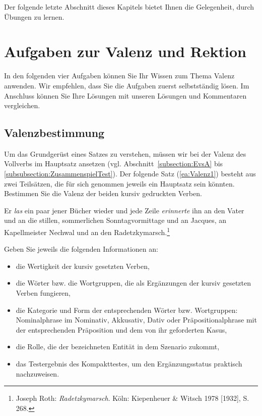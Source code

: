 Der folgende letzte Abschnitt dieses Kapitels bietet Ihnen die Gelegenheit, durch Übungen zu lernen.


\section{Aufgaben zur Valenz und Rektion}\label{section:Aufgaben_Valenz_Rektion}

In den folgenden vier Aufgaben können Sie Ihr Wissen zum Thema Valenz anwenden. Wir empfehlen, dass Sie die Aufgaben zuerst selbstständig lösen. Im Anschluss können Sie Ihre Lösungen mit unseren Lösungen und Kommentaren vergleichen.


\subsection{Valenzbestimmung}\label{subsection:Valenz1}

Um das Grundgerüst eines Satzes zu verstehen, müssen wir bei der Valenz des Vollverbs im Hauptsatz ansetzen (vgl. Abschnitt~\ref{subsection:EvsA} bis \ref{subsubsection:ZusammenspielTest}). Der folgende Satz (\ref{ea:Valenz1}) besteht aus zwei Teilsätzen, die für sich genommen jeweils ein Hauptsatz sein könnten. Bestimmen Sie die Valenz der beiden kursiv gedruckten Verben.

\ea \label{ea:Valenz1} Er \textit{las} ein paar jener Bücher wieder und jede Zeile \textit{erinnerte} ihn an den Vater und an die stillen, sommerlichen Sonntagvormittage und an Jacques, an Kapellmeister Nechwal und an den Radetzkymarsch.\footnote{Joseph Roth: \textit{Radetzkymarsch}. Köln: Kiepenheuer \& Witsch 1978 [1932], S. 268.}
\z 

Geben Sie jeweils die folgenden Informationen an: 

\begin{itemize}

\item die Wertigkeit der kursiv gesetzten Verben, 

\item die Wörter bzw. die Wortgruppen, die als Ergänzungen der kursiv gesetzten Verben fungieren,

\item die Kategorie und Form der entsprechenden Wörter bzw. Wortgruppen: Nominalphrase im Nominativ, Akkusativ, Dativ oder Präpositionalphrase mit der entsprechenden Präposition und dem von ihr geforderten Kasus,

\item die Rolle, die der bezeichneten Entität in dem Szenario zukommt,

\item das Testergebnis des Kompakttestes, um den Ergänzungsstatus praktisch nachzuweisen. 

\end{itemize}


